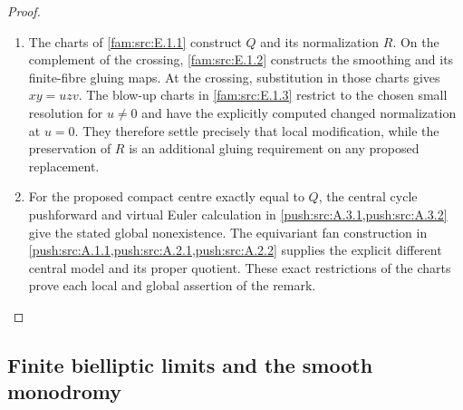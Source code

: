 \begin{proof}
\begin{enumerate}[label=\arabic*.,leftmargin=*]
\item The charts of \ref{fam:src:E.1.1} construct $Q$ and its normalization
$R$. On the complement of the crossing, \ref{fam:src:E.1.2}
constructs the smoothing and its finite-fibre gluing maps.
At the crossing, substitution in those charts gives $xy=uzv$.
The blow-up charts in \ref{fam:src:E.1.3} restrict to the chosen
small resolution for $u\ne0$ and have the explicitly computed
changed normalization at $u=0$. They therefore settle precisely
that local modification, while the preservation of $R$ is an
additional gluing requirement on any proposed replacement.

\item For the proposed compact centre exactly equal to $Q$, the central
cycle pushforward and virtual Euler calculation in
\ref{push:src:A.3.1,push:src:A.3.2} give the stated global
nonexistence. The equivariant fan construction in
\ref{push:src:A.1.1,push:src:A.2.1,push:src:A.2.2}
supplies the explicit different central model and its proper
quotient. These exact restrictions of the charts prove each
local and global assertion of the remark.
\end{enumerate}
\end{proof}



\subsection{Finite bielliptic limits and the smooth monodromy}\label{fam:section:E.2}

